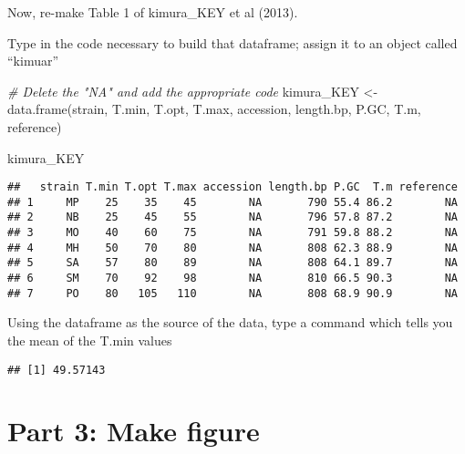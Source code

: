 \documentclass[
]{book}
\newenvironment{Shaded}{\begin{snugshade}}{\end{snugshade}}
\newcommand{\CommentTok}[1]{\textcolor[rgb]{0.56,0.35,0.01}{\textit{#1}}}
\newcommand{\FunctionTok}[1]{\textcolor[rgb]{0.00,0.00,0.00}{#1}}
\newcommand{\NormalTok}[1]{#1}
\newcommand{\OtherTok}[1]{\textcolor[rgb]{0.56,0.35,0.01}{#1}}
\newcommand{\SpecialCharTok}[1]{\textcolor[rgb]{0.00,0.00,0.00}{#1}}
\begin{document}
Now, re-make Table 1 of kimura\_KEY et al (2013).

Type in the code necessary to build that dataframe; assign it to an object called ``kimuar''

\begin{Shaded}
\begin{Highlighting}[]
\CommentTok{\# Delete the "NA" and add the appropriate code}
\NormalTok{kimura\_KEY  }\OtherTok{\textless{}{-}} \FunctionTok{data.frame}\NormalTok{(strain, }
\NormalTok{                      T.min, T.opt, T.max, }
\NormalTok{                      accession,}
\NormalTok{                      length.bp, P.GC, T.m, }
\NormalTok{                      reference)}
\end{Highlighting}
\end{Shaded}

\begin{Shaded}
\begin{Highlighting}[]
\NormalTok{kimura\_KEY}
\end{Highlighting}
\end{Shaded}

\begin{verbatim}
##   strain T.min T.opt T.max accession length.bp P.GC  T.m reference
## 1     MP    25    35    45        NA       790 55.4 86.2        NA
## 2     NB    25    45    55        NA       796 57.8 87.2        NA
## 3     MO    40    60    75        NA       791 59.8 88.2        NA
## 4     MH    50    70    80        NA       808 62.3 88.9        NA
## 5     SA    57    80    89        NA       808 64.1 89.7        NA
## 6     SM    70    92    98        NA       810 66.5 90.3        NA
## 7     PO    80   105   110        NA       808 68.9 90.9        NA
\end{verbatim}

Using the dataframe as the source of the data, type a command which tells you the mean of the T.min values

\begin{Shaded}
\end{Shaded}

\begin{verbatim}
## [1] 49.57143
\end{verbatim}

\hypertarget{part-3-make-figure}{%
\section{Part 3: Make figure}\label{part-3-make-figure}}
\end{document}
